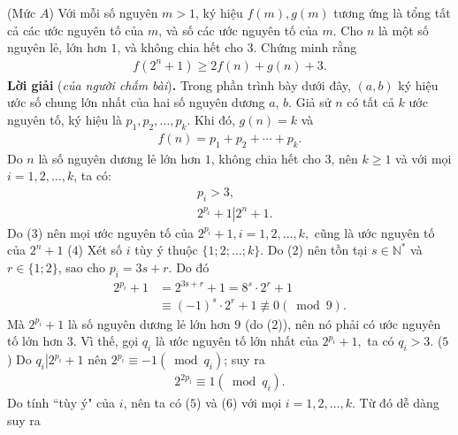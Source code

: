 \begin{multicols}{2}
	(Mức $A$) Với mỗi số nguyên $m > 1$, ký hiệu $f(m), g(m)$  tương ứng là tổng tất cả các ước nguyên tố của $m$, và số các ước nguyên tố của $m$. Cho $n$ là một số nguyên lẻ, lớn hơn $1$, và không chia hết cho $3$. Chứng minh rằng
	\begin{align*}
		f\left( {{2^n} + 1} \right) \ge 2f\left( n \right) + g\left( n \right) + 3.
	\end{align*}
	\textbf{\color{thachthuctoanhoc}Lời giải} (\textit{của người chấm bài})\textbf{\color{thachthuctoanhoc}.}
	\vskip 0.05cm
	Trong phần trình bày dưới đây, $(a, b)$ ký hiệu ước số chung lớn nhất của hai số nguyên dương $a$, $b$.
	\vskip 0.05cm
	Giả sử $n$ có tất cả $k$ ước nguyên tố, ký hiệu là ${p_1},{p_2}, \ldots ,{p_k}.$
	\vskip 0.05cm 
	Khi đó, $g\left( n \right) = k$  và 
	\begin{align*}
		f\left( n \right) = {p_1} + {p_2} +  \cdots  + {p_k}. \tag{$1$}
	\end{align*}
	Do $n$ là số nguyên dương lẻ lớn hơn $1$, không chia hết cho $3$, nên $k \ge 1$ và với mọi $i = 1, 2, \ldots, k$, ta có:
	\begin{align*}
		&{p_i} > 3, \tag{$2$}\\
		&{2^{{p_i}}} + 1\left| {{2^n} + 1} \right.. \tag{$3$}
	\end{align*}
	Do ($3$) nên mọi ước nguyên tố của ${2^{{p_i}}} + 1,  i = 1, 2, \ldots, k,$ cũng là ước nguyên tố của   $2^n +1$           \hfill ($4$)
	\vskip 0.05cm
	Xét số $i$ tùy ý thuộc $\{1; 2; \ldots; k\}$.
	\vskip 0.05cm
	Do ($2$) nên tồn tại $s \in \mathbb{N^*}$  và $r \in \{1; 2\}$, sao cho  $p_i = 3s + r$. Do đó
	\begin{align*}
		{2^{{p_i}}} + 1 &= {2^{3{\text{s}} + r}} + 1 = {8^s} \cdot {2^r} + 1\\ &\equiv {\left( { - 1} \right)^s} \cdot {2^r} + 1\not  \equiv 0\left( {\bmod 9} \right).
	\end{align*}
	Mà ${2^{{p_i}}} + 1$ là số nguyên dương lẻ lớn hơn $9$ (do ($2$)), nên nó phải có ước nguyên tố lớn hơn $3$. Vì thế, gọi $q_i$ là ước nguyên tố lớn nhất của ${2^{{p_i}}} + 1,$  ta có $q_i > 3$. \hfill                                          ($5$)
	\vskip 0.05cm     
	Do ${q_i}\left| {{2^{{p_i}}} + 1} \right.$  nên  ${2^{{p_i}}} \equiv  - 1\left( {\bmod {q_i}} \right)$; suy ra
	\begin{align*}
		{2^{2{p_i}}} \equiv 1\left( {\bmod {q_i}} \right).
	\end{align*}
	Do tính ``tùy ý" của $i$, nên ta có ($5$) và ($6$) với mọi $i = 1, 2, \ldots, k$.
	\vskip 0.05cm
	Từ đó dễ dàng suy ra

\end{multicols}

